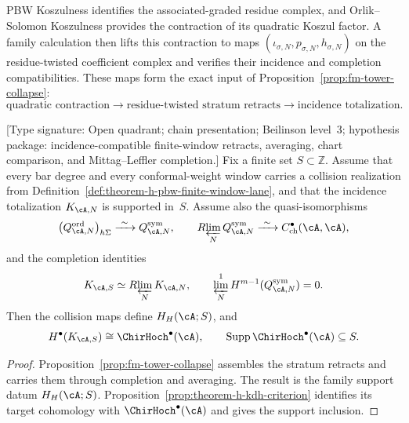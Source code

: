 \begin{remark}
\label{rem:pbw-parallel-consequences}
PBW Koszulness identifies the associated-graded residue complex, and
Orlik--Solomon Koszulness provides the contraction of its quadratic
Koszul factor.  A family calculation then lifts this contraction to
maps \((\iota_{\sigma,N},p_{\sigma,N},h_{\sigma,N})\) on the
residue-twisted coefficient complex and verifies their incidence and
completion compatibilities.  These maps form the exact input of
Proposition~\ref{prop:fm-tower-collapse}:
\[
 \text{quadratic contraction}
 \longrightarrow
 \text{residue-twisted stratum retracts}
 \longrightarrow
 \text{incidence totalization}.
\]
\end{remark}

\begin{proposition}
\label{prop:theorem-h-finite-window-collision-retracts}
\textup{[Type signature: Open quadrant; chain presentation;
Beilinson level~$3$; hypothesis package: incidence-compatible
finite-window retracts, averaging, chart comparison, and
Mittag--Leffler completion.]}
Fix a finite set \(S\subset\mathbb Z\).  Assume that every bar degree
and every conformal-weight window carries a collision realization from
Definition~\ref{def:theorem-h-pbw-finite-window-lane}, and that the
incidence totalization \(K_{\cA,N}\) is supported in~\(S\).  Assume
also the quasi-isomorphisms
\[
 \bigl(Q^{\mathrm{ord}}_{\cA,N}\bigr)_{h\Sigma}
 \xrightarrow{\ \sim\ }Q^{\mathrm{sym}}_{\cA,N},
 \qquad
 R\!\varprojlim_NQ^{\mathrm{sym}}_{\cA,N}
 \xrightarrow{\ \sim\ }C^\bullet_{\mathrm{ch}}(\cA,\cA),
\]
and the completion identities
\[
 K_{\cA,S}\simeq R\!\varprojlim_NK_{\cA,N},
 \qquad
 \varprojlim_N^1H^{m-1}(Q^{\mathrm{sym}}_{\cA,N})=0.
\]
Then the collision maps define \(H_H(\cA;S)\), and
\[
 H^\bullet(K_{\cA,S})\cong\ChirHoch^\bullet(\cA),
 \qquad
 \operatorname{Supp}\ChirHoch^\bullet(\cA)\subseteq S.
\]
\end{proposition}

\begin{proof}
Proposition~\ref{prop:fm-tower-collapse} assembles the stratum
retracts and carries them through completion and averaging.  The
result is the family support datum \(H_H(\cA;S)\).
Proposition~\ref{prop:theorem-h-kdh-criterion} identifies its target
cohomology with \(\ChirHoch^\bullet(\cA)\) and gives the support
inclusion.
\end{proof}


